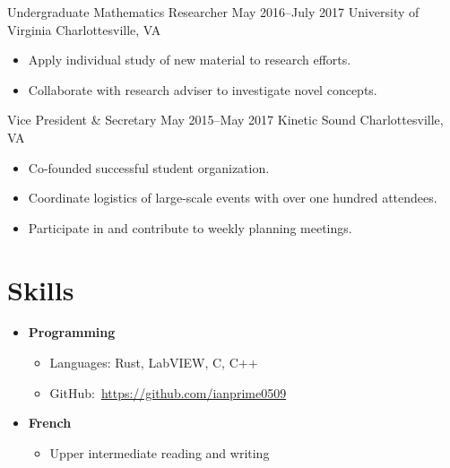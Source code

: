 \documentclass[12pt]{article}
\begin{document}
\entry
    {Undergraduate Mathematics Researcher}
    {May 2016--July 2017}
    {University of Virginia}
    {Charlottesville, VA}
\begin{itemize}
    \item Apply individual study of new material to research efforts.
    \item Collaborate with research adviser to investigate novel concepts.
\end{itemize}

\entry
    {Vice President \& Secretary}
    {May 2015--May 2017}
    {Kinetic Sound}
    {Charlottesville, VA}
\begin{itemize}
    \item Co-founded successful student organization.
    \item Coordinate logistics of large-scale events with over one hundred attendees.
    \item Participate in and contribute to weekly planning meetings.
\end{itemize}

\section*{Skills}
\begin{itemize}
    \item {\bf Programming}
    \begin{itemize}
        \item Languages: Rust, LabVIEW, C, C++
        \item GitHub:~\url{https://github.com/ianprime0509}
    \end{itemize}
    \item {\bf French}
    \begin{itemize}
        \item Upper intermediate reading and writing
    \end{itemize}
\end{itemize}
\end{document}
